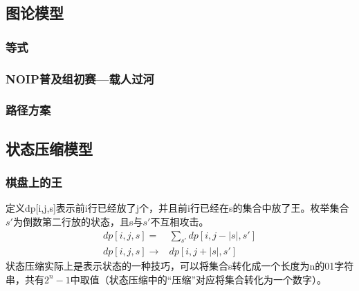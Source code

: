 \documentclass{article}
\begin{document}
\subsection{图论模型}
\subsubsection{等式}
\subsubsection{NOIP普及组初赛---载人过河}
\subsubsection{路径方案}
\subsection{状态压缩模型}

\subsubsection{棋盘上的王}
定义dp[i,j,s]表示前i行已经放了j个，并且前i行已经在s的集合中放了王。枚举集合$s'$为倒数第二行放的状态，且s与$s'$不互相攻击。
\begin{equation*}
    \begin{aligned}
        dp[i,j,s]=&\sum_{s'}dp[i,j-|s|,s']\\
        dp[i,j,s]\to& dp[i,j+|s|,s']
    \end{aligned}
\end{equation*}
状态压缩实际上是表示状态的一种技巧，可以将集合s转化成一个长度为n的01字符串，共有$2^n-1$中取值（状态压缩中的“压缩”对应将集合转化为一个数字）。
\end{document}
